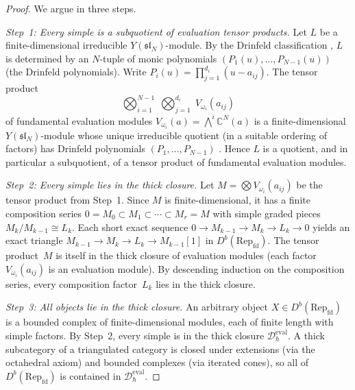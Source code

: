 \begin{proof}
We argue in three steps.

\emph{Step~1: Every simple is a subquotient of evaluation tensor
products.}
Let $L$ be a finite-dimensional irreducible
$Y(\mathfrak{sl}_N)$-module.  By the Drinfeld classification
\cite{Drinfeld88}, $L$ is determined by an $N$-tuple of monic
polynomials $(P_1(u), \ldots, P_{N-1}(u))$ (the Drinfeld
polynomials).  Write $P_i(u) = \prod_{j=1}^{d_i}(u - a_{ij})$.
The tensor product
\[
\bigotimes_{i=1}^{N-1}\; \bigotimes_{j=1}^{d_i}\;
V_{\omega_i}(a_{ij})
\]
of fundamental evaluation modules
$V_{\omega_i}(a) = \bigwedge^i \mathbb{C}^N(a)$ is a finite-dimensional
$Y(\mathfrak{sl}_N)$-module whose unique irreducible quotient (in a suitable
ordering of factors) has Drinfeld polynomials $(P_1, \ldots, P_{N-1})$
\cite{Drinfeld88}.  Hence $L$ is a quotient, and in particular a
subquotient, of a tensor product of fundamental evaluation modules.

\emph{Step~2: Every simple lies in the thick closure.}
Let $M = \bigotimes V_{\omega_i}(a_{ij})$ be the tensor product
from Step~1.  Since $M$ is finite-dimensional, it has a
finite composition series $0 = M_0 \subset M_1 \subset \cdots
\subset M_r = M$ with simple graded pieces
$M_k/M_{k-1} \cong L_k$.  Each short exact sequence
$0 \to M_{k-1} \to M_k \to L_k \to 0$ yields an exact triangle
$M_{k-1} \to M_k \to L_k \to M_{k-1}[1]$ in
$D^b(\mathrm{Rep}_{\mathrm{fd}})$.  The tensor product~$M$ is itself
in the thick closure of evaluation modules (each factor
$V_{\omega_i}(a_{ij})$ is an evaluation module).  By descending
induction on the composition series, every composition factor~$L_k$
lies in the thick closure.

\emph{Step~3: All objects lie in the thick closure.}
An arbitrary object $X \in D^b(\mathrm{Rep}_{\mathrm{fd}})$ is a
bounded complex of finite-dimensional modules, each of finite length
with simple factors.  By Step~2, every simple is in the thick closure
$\mathcal{D}_{\hbar}^{\mathrm{eval}}$.  A thick subcategory of a
triangulated category is closed under extensions (via the octahedral
axiom) and bounded complexes (via iterated cones), so all of
$D^b(\mathrm{Rep}_{\mathrm{fd}})$ is contained in
$\mathcal{D}_{\hbar}^{\mathrm{eval}}$.
\end{proof}

